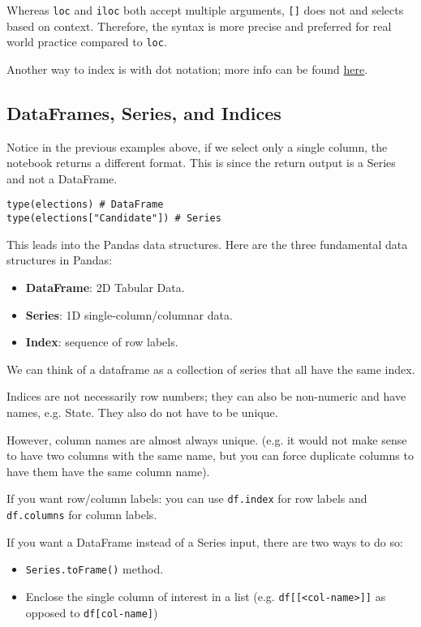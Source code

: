 \begin{notebox}
Whereas \texttt{loc} and \texttt{iloc} both accept multiple arguments, \texttt{[]} does not and selects based on context. Therefore, the syntax is more precise and preferred for real world practice compared to \texttt{loc}.

Another way to index is with dot notation; more info can be found \href{https://www.dataschool.io/pandas-dot-notation-vs-brackets/}{\color{blue}here}.
\end{notebox}

\subsection{DataFrames, Series, and Indices}
Notice in the previous examples above, if we select only a single column, the notebook returns a different format. This is since the return output is a Series and not a DataFrame.

\begin{verbatim}
type(elections) # DataFrame
type(elections["Candidate"]) # Series
\end{verbatim}

This leads into the Pandas data structures. Here are the three fundamental data structures in Pandas:
\begin{itemize}
\item \textbf{DataFrame}: 2D Tabular Data.
\item \textbf{Series}: 1D single-column/columnar data.
\item \textbf{Index}: sequence of row labels.
\end{itemize}
We can think of a dataframe as a collection of series that all have the same index.

Indices are not necessarily row numbers; they can also be non-numeric and have names, e.g. State. They also do not have to be unique.

However, column names are almost always unique. (e.g. it would not make sense to have two columns with the same name, but you can force duplicate columns to have them have the same column name).

If you want row/column labels: you can use \texttt{df.index} for row labels and \texttt{df.columns} for column labels.
\begin{notebox}
If you want a DataFrame instead of a Series input, there are two ways to do so:
\begin{itemize}
\item \texttt{Series.toFrame()} method.
\item Enclose the single column of interest in a list (e.g. \texttt{df[[<col-name>]]} as opposed to \texttt{df[col-name]})
\end{itemize}
\end{notebox}


